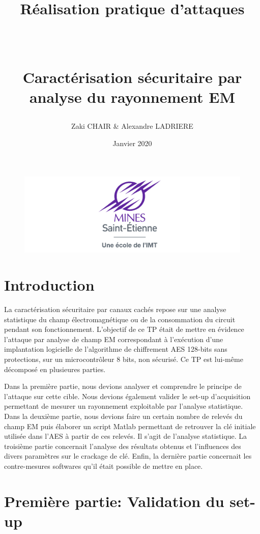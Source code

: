 \documentclass[a4paper, 12pt]{article}
\title{\huge{\begin{bf} Réalisation pratique d'attaques\end{bf}} \\ \begin{doublespacing} \large{Caractérisation sécuritaire par analyse du rayonnement EM} \end{doublespacing} \vspace{\fill}}
\author{Zaki CHAIR \& Alexandre LADRIERE}
\date{Janvier 2020}
\begin{document}
	\begin{figure}
	\begin{center}
	\includegraphics[scale=0.5]{images/emse_logo.png}
	\end{center}
	\end{figure}

\maketitle\thispagestyle{empty}
\newpage
\tableofcontents
\newpage

\section{Introduction}
La caractérisation sécuritaire par canaux cachés repose sur une analyse statistique du champ électromagnétique ou de la consommation du circuit pendant son fonctionnement.
L'objectif de ce TP était de mettre en évidence l'attaque par analyse de champ EM correspondant à l'exécution d'une implantation logicielle de l'algorithme de chiffrement AES 128-bits sans protections, sur un microcontrôleur 8 bits, non sécurisé. Ce TP est lui-même décomposé en plusieures parties. 

Dans la première partie, nous devions analyser et comprendre le principe de l'attaque sur cette cible. Nous devions également valider le set-up d'acquisition permettant de mesurer un rayonnement exploitable par l'analyse statistique. Dans la deuxième partie, nous devions faire un certain nombre de relevés du champ EM puis élaborer un script Matlab permettant de retrouver la clé initiale utilisée dans l'AES à partir de ces relevés. Il s'agit de l'analyse statistique. La troisième partie concernait l'analyse des résultats obtenus et l'influences des divers paramètres sur le crackage de clé. Enfin, la dernière partie concernait les contre-mesures softwares qu'il était possible de mettre en place. 
\newpage
\section{Première partie: Validation du set-up}
\end{document}
